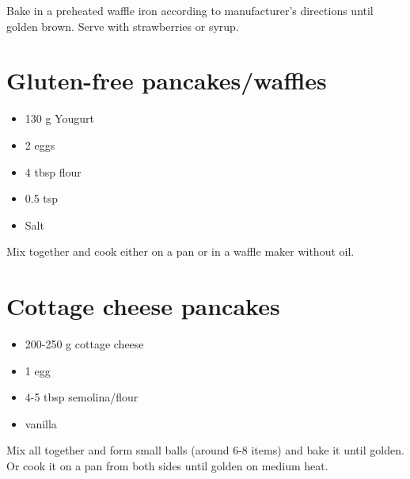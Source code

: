 \documentclass[
]{book}
\providecommand{\tightlist}{%
  \setlength{\itemsep}{0pt}\setlength{\parskip}{0pt}}
\begin{document}
Bake in a preheated waffle iron according to manufacturer's directions until golden brown. Serve with strawberries or syrup.

\hypertarget{gluten-free-pancakeswaffles}{%
\section{Gluten-free pancakes/waffles}\label{gluten-free-pancakeswaffles}}

\begin{itemize}
\tightlist
\item
  130 g Yougurt
\item
  2 eggs
\item
  4 tbsp flour
\item
  0.5 tsp
\item
  Salt
\end{itemize}

Mix together and cook either on a pan or in a waffle maker without oil.

\hypertarget{cottage-cheese-pancakes}{%
\section{Cottage cheese pancakes}\label{cottage-cheese-pancakes}}

\begin{itemize}
\tightlist
\item
  200-250 g cottage cheese
\item
  1 egg
\item
  4-5 tbsp semolina/flour
\item
  vanilla
\end{itemize}

Mix all together and form small balls (around 6-8 items) and bake it until golden. Or cook it on a pan from both sides until golden on medium heat.
\end{document}
